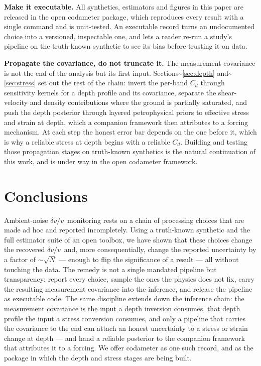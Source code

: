 \documentclass[
  11pt,
  letterpaper,
]{article}
\providecommand{\dvv}{\ensuremath{\delta v/v}}
\begin{document}
\textbf{Make it executable.} All synthetics, estimators and figures in
this paper are released in the open codameter package, which reproduces
every result with a single command and is unit-tested. An executable
record turns an undocumented choice into a versioned, inspectable one,
and lets a reader re-run a study's pipeline on the truth-known synthetic
to see its bias before trusting it on data.

\textbf{Propagate the covariance, do not truncate it.} The measurement
covariance is not the end of the analysis but its first input.
Sections\textasciitilde{}\ref{sec:depth}
and\textasciitilde{}\ref{sec:stress} set out the rest of the chain:
invert the per-band \(C_d\) through sensitivity kernels for a depth
profile and its covariance, separate the shear-velocity and density
contributions where the ground is partially saturated, and push the
depth posterior through layered petrophysical priors to effective stress
and strain at depth, which a companion framework then attributes to a
forcing mechanism. At each step the honest error bar depends on the one
before it, which is why a reliable stress at depth begins with a
reliable \(C_d\). Building and testing those propagation stages on
truth-known synthetics is the natural continuation of this work, and is
under way in the open codameter framework.

\section{Conclusions}\label{sec:conclusions}

Ambient-noise \dvv~monitoring rests on a chain of processing choices
that are made ad hoc and reported incompletely. Using a truth-known
synthetic and the full estimator suite of an open toolbox, we have shown
that these choices change the recovered \dvv~and, more consequentially,
change the reported uncertainty by a factor of \(\sim\!\sqrt{N}\) ---
enough to flip the significance of a result --- all without touching the
data. The remedy is not a single mandated pipeline but transparency:
report every choice, sample the ones the physics does not fix, carry the
resulting measurement covariance into the inference, and release the
pipeline as executable code. The same discipline extends down the
inference chain: the measurement covariance is the input a depth
inversion consumes, that depth profile the input a stress conversion
consumes, and only a pipeline that carries the covariance to the end can
attach an honest uncertainty to a stress or strain change at depth ---
and hand a reliable posterior to the companion framework that attributes
it to a forcing. We offer codameter as one such record, and as the
package in which the depth and stress stages are being built.
\end{document}
